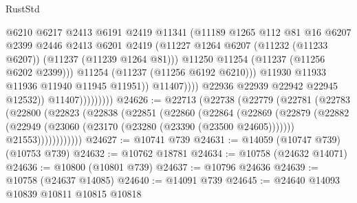 \begin{lexlean}{RustStd}
\begin{coremodule}
                                        @6210
                                        @6217
                                        @2413
                                        @6191
                                        @2419
                                        @11341
                                        (@11189
                                          @1265
                                          @112
                                          @81
                                          @16
                                          @6207
                                          @2399
                                          @2446
                                          @2413
                                          @6201
                                          @2419
                                          (@11227
                                            @1264
                                            @6207
                                            (@11232 (@11233 @6207))
                                            (@11237 (@11239 @1264 @81)))
                                          @11250
                                          @11254
                                          (@11237 (@11256 @6202 @2399)))
                                        @11254
                                        (@11237 (@11256 @6192 @6210)))
                                      @11930
                                      @11933
                                      @11936
                                      @11940
                                      @11945
                                      @11951))
                                  @11407))))
                          @22936
                          @22939
                          @22942
                          @22945
                          @12532))
                      @11407)))))))))
@24626 := @22713
    (@22738
      (@22779
        (@22781
          (@22783
            (@22800
              (@22823
                (@22838
                  (@22851
                    (@22860
                      (@22864
                        (@22869
                          (@22879
                            (@22882 (@22949 (@23060 (@23170 (@23280 (@23390 (@23500 @24605)))))))
                            @21553))))))))))))
@24627 := @10741 @739
@24631 := @14059 (@10747 @739) (@10753 @739)
@24632 := @10762 @18781
@24634 := @10758 (@24632 @14071)
@24636 := @10800 (@10801 @739)
@24637 := @10796 @24636
@24639 := @10758 (@24637 @14085)
@24640 := @14091 @739
@24645 := @24640 @14093 @10839 @10811 @10815 @10818

\end{coremodule}
\end{lexlean}
